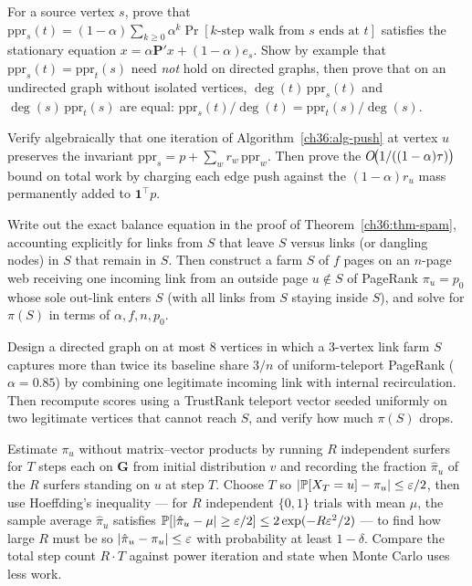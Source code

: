 \begin{exercise}
For a source vertex $s$, prove that $\mathrm{ppr}_s(t) = (1-\alpha)\sum_{k\ge0}\alpha^k \Pr[\text{$k$-step walk from $s$ ends at $t$}]$ satisfies the stationary equation $x = \alpha\mathbf{P}'x + (1-\alpha)e_s$. Show by example that $\mathrm{ppr}_s(t) = \mathrm{ppr}_t(s)$ need \emph{not} hold on directed graphs, then prove that on an undirected graph without isolated vertices, $\deg(t)\,\mathrm{ppr}_s(t)$ and $\deg(s)\,\mathrm{ppr}_t(s)$ are equal: $\mathrm{ppr}_s(t)/\deg(t) = \mathrm{ppr}_t(s)/\deg(s)$.
\end{exercise}

\begin{exercise}
Verify algebraically that one iteration of Algorithm~\ref{ch36:alg-push} at vertex $u$ preserves the invariant $\mathrm{ppr}_s = p + \sum_w r_w\,\mathrm{ppr}_w$. Then prove the $O\!\big(1/((1-\alpha)\tau)\big)$ bound on total work by charging each edge push against the $(1-\alpha)r_u$ mass permanently added to $\mathbf{1}^\top p$.
\end{exercise}

\begin{exercise}
Write out the exact balance equation in the proof of Theorem~\ref{ch36:thm-spam}, accounting explicitly for links from $S$ that leave $S$ versus links (or dangling nodes) in $S$ that remain in $S$. Then construct a farm $S$ of $f$ pages on an $n$-page web receiving one incoming link from an outside page $u \notin S$ of PageRank $\pi_u = p_0$ whose sole out-link enters $S$ (with all links from $S$ staying inside $S$), and solve for $\pi(S)$ in terms of $\alpha, f, n, p_0$.
\end{exercise}

\begin{exercise}
Design a directed graph on at most $8$ vertices in which a $3$-vertex link farm $S$ captures more than twice its baseline share $3/n$ of uniform-teleport PageRank ($\alpha = 0.85$) by combining one legitimate incoming link with internal recirculation. Then recompute scores using a TrustRank teleport vector seeded uniformly on two legitimate vertices that cannot reach $S$, and verify how much $\pi(S)$ drops.
\end{exercise}

\begin{exercise}
Estimate $\pi_u$ without matrix--vector products by running $R$ independent surfers for $T$ steps each on $\mathbf{G}$ from initial distribution $v$ and recording the fraction $\hat{\pi}_u$ of the $R$ surfers standing on $u$ at step $T$. Choose $T$ so $\lvert\operatorname{\mathbb{P}}[X_T = u] - \pi_u\rvert \le \varepsilon/2$, then use Hoeffding's inequality --- for $R$ independent $\{0,1\}$ trials with mean $\mu$, the sample average $\hat{\pi}_u$ satisfies $\operatorname{\mathbb{P}}[\lvert\hat{\pi}_u - \mu\rvert \ge \varepsilon/2] \le 2\exp(-R\varepsilon^2/2)$ --- to find how large $R$ must be so $\lvert\hat{\pi}_u - \pi_u\rvert \le \varepsilon$ with probability at least $1-\delta$. Compare the total step count $R\cdot T$ against power iteration and state when Monte Carlo uses less work.
\end{exercise}

